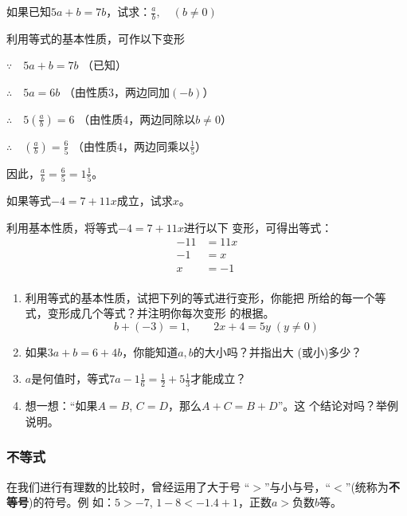 \begin{example}
如果已知$5a + b = 7b$，试求：$\frac{a}{b},\quad (b\ne 0)$
\end{example}

\begin{solution}
    利用等式的基本性质，可作以下变形

    $\because\quad 5a+b=7b$ （已知）

    $\therefore\quad 5a=6b$ （由性质3，两边同加$(-b)$）

    $\therefore\quad 5\left(\frac{a}{b}\right)=6$ （由性质4，两边同除以$b\ne 0$）

    $\therefore\quad \left(\frac{a}{b}\right)=\frac{6}{5}$ （由性质4，两边同乘以$\frac{1}{5}$）

    因此，$\frac{a}{b}=\frac{6}{5}=1\frac{1}{5}$。
\end{solution}

\begin{example}
    如果等式$-4=7+11x$成立，试求$x$。
\end{example}

\begin{solution}
    利用基本性质，将等式$-4=7+11x$进行以下
变形，可得出等式：
\begin{align*}
    -11&=11x  \tag{两边同减去7}\\
    -1&=x  \tag{两边同除以11}\\
    x&=-1  \tag{两边对调位置}\\
\end{align*}
\end{solution}

\begin{ex}
 \begin{enumerate}
     \item 利用等式的基本性质，试把下列的等式进行变形，你能把
     所给的每一个等式，变形成几个等式？并注明你每次变形
     的根据。
    \[b+(-3)=1,\qquad 2x+4=5y\; (y\ne 0) \]
     \item 如果$3a+b=6+4b$，你能知道$a,b$的大小吗？并指出大
       (或小)多少？
      \item $a$是何值时，等式$7a-1\frac{1}{6}=\frac{1}{2}+5\frac{1}{3}$才能成立？

   \item 想一想：“如果$A=B$, $C=D$，那么$A+C=B+D$”。这
     个结论对吗？举例说明。
 \end{enumerate}   
\end{ex}

\subsubsection{不等式}
在我们进行有理数的比较时，曾经运用了大于号
“$>$”与小与号，“$<$”(统称为\textbf{不等号})的符号。例
如：$5>-7$,  $1-8<-1.4+1$，正数$a>$负数$b$等。

